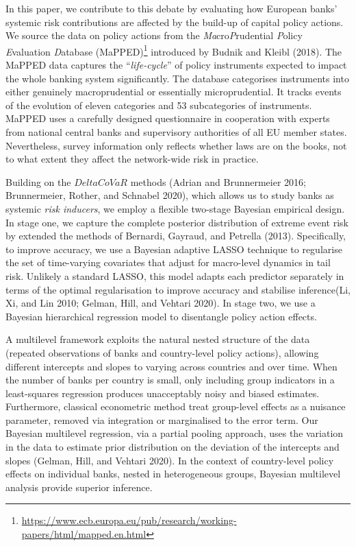 \documentclass[
  10pt,
]{article}
\begin{document}
In this paper, we contribute to this debate by evaluating how European
banks' systemic risk contributions are affected by the build-up of
capital policy actions. We source the data on policy actions from the
\emph{Ma}cro\emph{P}rudential \emph{P}olicy \emph{E}valuation
\emph{D}atabase (MaPPED)\footnote{\url{https://www.ecb.europa.eu/pub/research/working-papers/html/mapped.en.html}}
introduced by Budnik and Kleibl (2018). The MaPPED data captures the
``\emph{life-cycle}'' of policy instruments expected to impact the whole
banking system significantly. The database categorises instruments into
either genuinely macroprudential or essentially microprudential. It
tracks events of the evolution of eleven categories and 53 subcategories
of instruments. MaPPED uses a carefully designed questionnaire in
cooperation with experts from national central banks and supervisory
authorities of all EU member states. Nevertheless, survey information
only reflects whether laws are on the books, not to what extent they
affect the network-wide risk in practice.

Building on the \(Delta CoVaR\) methods (Adrian and Brunnermeier 2016;
Brunnermeier, Rother, and Schnabel 2020), which allows us to study banks
as systemic \emph{risk inducers}, we employ a flexible two-stage
Bayesian empirical design. In stage one, we capture the complete
posterior distribution of extreme event risk by extended the methods of
Bernardi, Gayraud, and Petrella (2013). Specifically, to improve
accuracy, we use a Bayesian adaptive LASSO technique to regularise the
set of time-varying covariates that adjust for macro-level dynamics in
tail risk. Unlikely a standard LASSO, this model adapts each predictor
separately in terms of the optimal regularisation to improve accuracy
and stabilise inference(Li, Xi, and Lin 2010; Gelman, Hill, and Vehtari
2020). In stage two, we use a Bayesian hierarchical regression model to
disentangle policy action effects.

A multilevel framework exploits the natural nested structure of the data
(repeated observations of banks and country-level policy actions),
allowing different intercepts and slopes to varying across countries and
over time. When the number of banks per country is small, only including
group indicators in a least-squares regression produces unacceptably
noisy and biased estimates. Furthermore, classical econometric method
treat group-level effects as a nuisance parameter, removed via
integration or marginalised to the error term. Our Bayesian multilevel
regression, via a partial pooling approach, uses the variation in the
data to estimate prior distribution on the deviation of the intercepts
and slopes (Gelman, Hill, and Vehtari 2020). In the context of
country-level policy effects on individual banks, nested in
heterogeneous groups, Bayesian multilevel analysis provide superior
inference.
\end{document}
